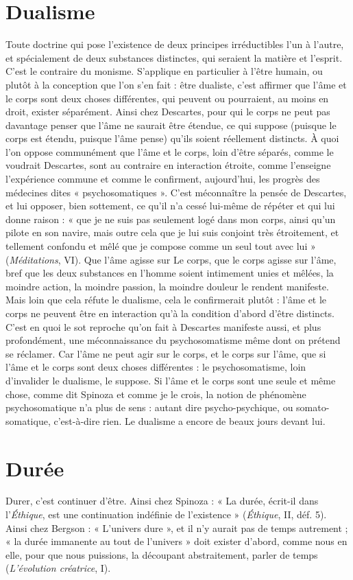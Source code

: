 \section{Dualisme}
Toute doctrine qui pose l’existence de deux principes irréductibles
l’un à l’autre, et spécialement de deux substances distinctes,
qui seraient la matière et l’esprit. C’est le contraire du monisme.
S’applique en particulier à l’être humain, ou plutôt à la conception que l’on
s’en fait : être dualiste, c’est affirmer que l’âme et le corps sont deux choses différentes,
qui peuvent ou pourraient, au moins en droit, exister séparément.
Ainsi chez Descartes, pour qui le corps ne peut pas davantage penser que l’âme
ne saurait être étendue, ce qui suppose (puisque le corps est étendu, puisque
l’âme pense) qu’ils soient réellement distincts. À quoi l’on oppose communément
que l’âme et le corps, loin d’être séparés, comme le voudrait Descartes,
sont au contraire en interaction étroite, comme l’enseigne l’expérience commune
et comme le confirment, aujourd’hui, les progrès des médecines dites
« psychosomatiques ». C’est méconnaître la pensée de Descartes, et lui
opposer, bien sottement, ce qu’il n’a cessé lui-même de répéter et qui lui donne
raison : « que je ne suis pas seulement logé dans mon corps, ainsi qu’un pilote
en son navire, mais outre cela que je lui suis conjoint très étroitement, et tellement
confondu et mêlé que je compose comme un seul tout avec lui » ({\it Méditations}, VI).
Que l'âme agisse sur Le corps, que le corps agisse sur l’âme, bref que
les deux substances en l’homme soient intimement unies et mêlées, la moindre
action, la moindre passion, la moindre douleur le rendent manifeste. Mais loin
que cela réfute le dualisme, cela le confirmerait plutôt : l’âme et le corps ne
peuvent être en interaction qu’à la condition d’abord d’être distincts. C’est en
quoi le sot reproche qu’on fait à Descartes manifeste aussi, et plus profondément,
une méconnaissance du psychosomatisme même dont on prétend se
réclamer. Car l’âme ne peut agir sur le corps, et le corps sur l’âme, que si l’âme
et le corps sont deux choses différentes : le psychosomatisme, loin d’invalider le
dualisme, le suppose. Si l’âme et le corps sont une seule et même chose, comme
dit Spinoza et comme je le crois, la notion de phénomène psychosomatique n’a
plus de sens : autant dire psycho-psychique, ou somato-somatique, c’est-à-dire
rien. Le dualisme a encore de beaux jours devant lui.

\section{Durée}
Durer, c’est continuer d’être. Ainsi chez Spinoza : « La durée, écrit-il
dans l’{\it Éthique}, est une continuation indéfinie de l'existence »
({\it Éthique}, II, déf. 5). Ainsi chez Bergson : « L'univers dure », et il n’y aurait pas
de temps autrement ; « la durée immanente au tout de l’univers » doit exister
d’abord, comme nous en elle, pour que nous puissions, la découpant abstraitement,
parler de temps ({\it L'évolution créatrice}, I).

